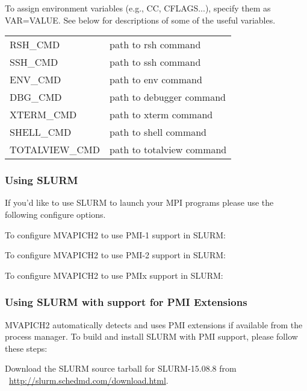 To assign environment variables (e.g., CC, CFLAGS...), specify them as
VAR=VALUE.  See below for descriptions of some of the useful variables.

\begin{tabular}{l l}
RSH\_CMD     & path to rsh command \\
SSH\_CMD     & path to ssh command \\
ENV\_CMD     & path to env command \\
DBG\_CMD     & path to debugger command \\
XTERM\_CMD   & path to xterm command \\
SHELL\_CMD   & path to shell command \\
TOTALVIEW\_CMD & path to totalview command \\
\end{tabular}

\subsubsection{Using SLURM}
\label{subsec:config-slurm}

If you'd like to use SLURM to launch your MPI programs please use the following
configure options.

To configure MVAPICH2 to use PMI-1 support in SLURM:


To configure MVAPICH2 to use PMI-2 support in SLURM:


To configure MVAPICH2 to use PMIx support in SLURM:


\subsubsection{Using SLURM with support for PMI Extensions}
\label{subsec:config-slurm-pmix}

MVAPICH2 automatically detects and uses PMI extensions if available from the
process manager. To build and install SLURM with PMI support, please follow
these steps:

Download the SLURM source tarball for SLURM-15.08.8 from \\
~\href{http://slurm.schedmd.com/download.html}{http://slurm.schedmd.com/download.html}.

